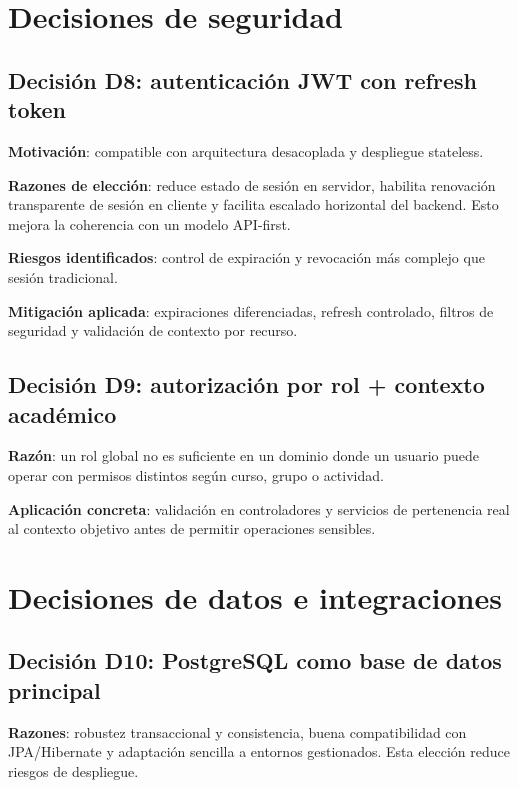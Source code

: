 \FloatBarrier
\section{Decisiones de seguridad}

\subsection{Decisi\'on D8: autenticaci\'on JWT con refresh token}

\textbf{Motivaci\'on}:
compatible con arquitectura desacoplada y despliegue stateless.

\textbf{Razones de elecci\'on}: reduce estado de sesi\'on en servidor, habilita renovaci\'on transparente de sesi\'on en cliente y facilita escalado horizontal del backend. Esto mejora la coherencia con un modelo API-first.

\textbf{Riesgos identificados}:
control de expiraci\'on y revocaci\'on m\'as complejo que sesi\'on tradicional.

\textbf{Mitigaci\'on aplicada}:
expiraciones diferenciadas, refresh controlado,
filtros de seguridad y validaci\'on de contexto por recurso.

\subsection{Decisi\'on D9: autorizaci\'on por rol + contexto acad\'emico}

\textbf{Raz\'on}:
un rol global no es suficiente en un dominio donde un usuario
puede operar con permisos distintos seg\'un curso, grupo o actividad.

\textbf{Aplicaci\'on concreta}:
validaci\'on en controladores y servicios de pertenencia real
al contexto objetivo antes de permitir operaciones sensibles.

\FloatBarrier
\section{Decisiones de datos e integraciones}

\subsection{Decisi\'on D10: PostgreSQL como base de datos principal}

\textbf{Razones}: robustez transaccional y consistencia, buena compatibilidad con JPA/Hibernate y adaptaci\'on sencilla a entornos gestionados. Esta elecci\'on reduce riesgos de despliegue.

